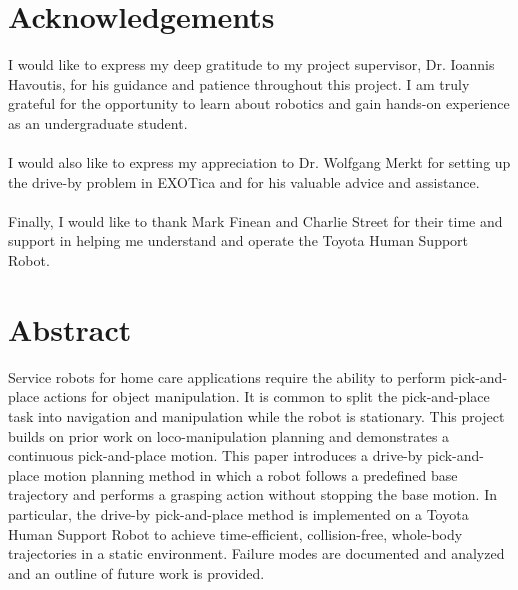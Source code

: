 \documentclass[12pt]{article}
\begin{document}
\section{Acknowledgements}
    I would like to express my deep gratitude to my project supervisor, Dr. Ioannis Havoutis, for his guidance and patience throughout this project. I am truly grateful for the opportunity to learn about robotics and gain hands-on experience as an undergraduate student.\\
    \hspace*{\fill}\\
    I would also like to express my appreciation to Dr. Wolfgang Merkt for setting up the drive-by problem in EXOTica and for his valuable advice and assistance.\\
    \hspace*{\fill}\\
    Finally, I would like to thank Mark Finean and Charlie Street for their time and support in helping me understand and operate the Toyota Human Support Robot.
\newpage


\section{Abstract}
    Service robots for home care applications require the ability to perform pick-and-place actions for object manipulation. It is common to split the pick-and-place task into navigation and manipulation while the robot is stationary. This project builds on prior work on loco-manipulation planning and demonstrates a continuous pick-and-place motion. This paper introduces a drive-by pick-and-place motion planning method in which a robot follows a predefined base trajectory and performs a grasping action without stopping the base motion. In particular, the drive-by pick-and-place method is implemented on a Toyota Human Support Robot to achieve time-efficient, collision-free, whole-body trajectories in a static environment. Failure modes are documented and analyzed and an outline of future work is provided.
\newpage
\tableofcontents
\newpage
\end{document}
